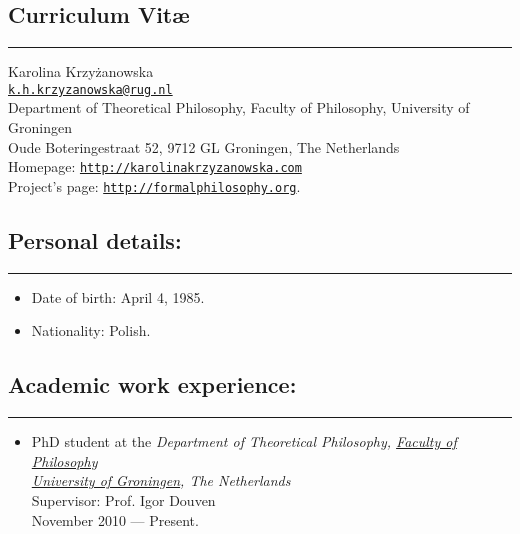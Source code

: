 \documentclass[a4paper,12pt]{article}
\begin{document}
\newcommand{\headone}[1] {
 \section*{#1}
\rule[2.5ex]{\textwidth}{2pt}}

\newcommand{\headtwo}[1]{
  \subsection*{#1}
  \rule[1.5ex]{\textwidth}{.5pt}}

\newcommand{\headthree}[1]{ {\large #1}}

\newcommand{\link}[1]{ \texttt{\href{#1}{#1}}}

\begin{small}

  \headone{Curriculum Vit\ae}
  
  Karolina Krzyżanowska\\
  \href{mailto:k.h.krzyzanowska@rug.nl}{\texttt{k.h.krzyzanowska@rug.nl}}\\
  Department of Theoretical Philosophy, Faculty of Philosophy, University of Groningen\\
  Oude Boteringestraat 52, 9712 GL Groningen, The Netherlands\\
  Homepage: \href{http://karolinakrzyzanowska.com}{\texttt{http://karolinakrzyzanowska.com}}\\
  Project's page:
  \href{http://formalphilosophy.org}{\texttt{http://formalphilosophy.org}}.

  \headtwo{Personal details:}
  \begin{itemize}
  \item Date of birth: April 4, 1985.
 \item Nationality: Polish.
  \end{itemize}

  \headtwo{Academic work experience:}
  \begin{itemize}
  \item PhD student at
    the %
    \emph{Department of Theoretical Philosophy, \href{http://www.rug.nl/filosofie/}{Faculty of Philosophy}\\
      \href{http://www.rug.nl}{University of Groningen}, The Netherlands}\\
    Supervisor: Prof. Igor Douven\\
    November 2010 --- Present.



\end{itemize}
\end{small}
\end{document}
